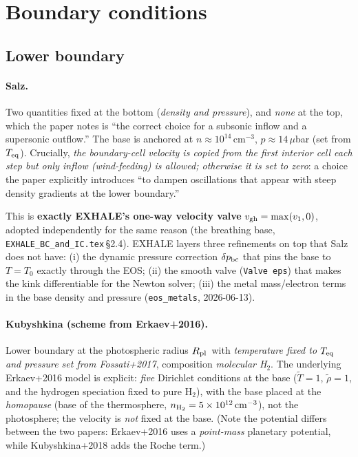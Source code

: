 \documentclass[english,a4paper]{my_memo}
\newcommand{\Rp}{$R_{\rm pl}$}
\begin{document}
\section{Boundary conditions}
\label{sec:bc}

\subsection{Lower boundary}

\paragraph{Salz.} Two quantities fixed at the bottom (\emph{density
and pressure}), and \emph{none} at the top, which the paper notes is
``the correct choice for a subsonic inflow and a supersonic outflow.''
The base is anchored at $n\approx10^{14}\,\mathrm{cm^{-3}}$,
$p\approx14\,\mu$bar (set from $T_{\rm eq}$). Crucially, \emph{the
boundary-cell velocity is copied from the first interior cell each step
but only inflow (wind-feeding) is allowed; otherwise it is set to zero}:
a choice the paper explicitly introduces ``to dampen oscillations
that appear with steep density gradients at the lower boundary.''

This is \textbf{exactly EXHALE's one-way velocity valve}
$v_{\rm gh}=\max(v_1,0)$, adopted independently for the same reason (the
breathing base, \texttt{EXHALE\_BC\_and\_IC.tex}\,\S2.4). EXHALE layers
three refinements on top that Salz does not have: (i) the dynamic
pressure correction $\delta p_{\rm bc}$ that pins the base to $T=T_0$
exactly through the EOS; (ii) the smooth valve (\texttt{Valve eps}) that
makes the kink differentiable for the Newton solver; (iii) the metal
mass/electron terms in the base density and pressure
(\texttt{eos\_metals}, 2026-06-13).

\paragraph{Kubyshkina (scheme from Erkaev+2016).} Lower boundary at the
photospheric radius \Rp\ with \emph{temperature fixed to $T_{\rm eq}$
and pressure set from Fossati+2017}, composition \emph{molecular H$_2$}.
The underlying Erkaev+2016 model is explicit: \emph{five} Dirichlet
conditions at the base ($\tilde T{=}1$, $\tilde\rho{=}1$, and the
hydrogen speciation fixed to pure H$_2$), with the base placed at the
\emph{homopause} (base of the thermosphere, $n_{\rm H_2}=5\times10^{12}\,
\mathrm{cm^{-3}}$), not the photosphere; the velocity is \emph{not}
fixed at the base. (Note the potential differs between the two papers:
Erkaev+2016 uses a \emph{point-mass} planetary potential, while
Kubyshkina+2018 adds the Roche term.)
\end{document}

